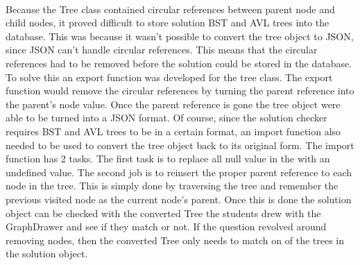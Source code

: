 \\[11pt]
Because the Tree class contained circular references between parent node and child nodes, it proved difficult to store solution BST and AVL trees into the database. This was because it wasn't possible to convert the tree object to JSON, since JSON can't handle circular references. This means that the circular references had to be removed before the solution could be stored in the database. To solve this an export function was developed for the tree class. The export function would remove the circular references by turning the parent reference into the parent's node value. Once the parent reference is gone the tree object were able to be turned into a JSON format. Of course, since the solution checker requires BST and AVL trees to be in a certain format, an import function also needed to be used to convert the tree object back to its original form. The import function has 2 tasks. The first task is to replace all null value in the with an undefined value. The second job is to reinsert the proper parent reference to each node in the tree. This is simply done by traversing the tree and remember the previous visited node as the current node's parent. Once this is done the solution object can be checked with the converted Tree the students drew with the GraphDrawer and see if they match or not. If the question revolved around removing nodes, then the converted Tree only needs to match on of the trees in the solution object.

